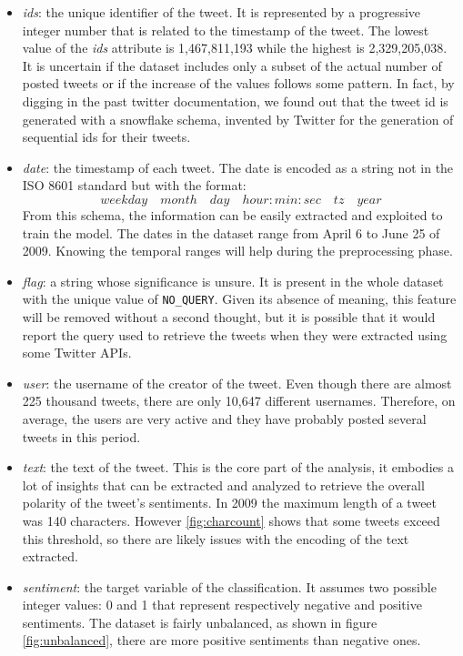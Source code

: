 \documentclass[conference]{IEEEtran}
\begin{document}
\begin{itemize}
    \item \textit{ids}: the unique identifier of the tweet. It is represented by a progressive integer number that is related to the timestamp of the tweet. The lowest value of the \textit{ids} attribute is 1,467,811,193 while the highest is 2,329,205,038. It is uncertain if the dataset includes only a subset of the actual number of posted tweets or if the increase of the values follows some pattern. In fact, by digging in the past twitter documentation, we found out that the tweet id is generated with a snowflake schema, invented by Twitter for the generation of sequential ids for their tweets.
    \item \textit{date}: the timestamp of each tweet. The date is encoded as a string not in the ISO 8601 standard\cite{iso8601} but with the format:
    $$weekday \quad month \quad day \quad hour:min:sec \quad tz \quad year$$
    From this schema, the information can be easily extracted and exploited to train the model. The dates in the dataset range from April 6 to June 25 of 2009. Knowing the temporal ranges will help during the preprocessing phase.
    \item \textit{flag}: a string whose significance is unsure. It is present in the whole dataset with the unique value of \texttt{NO\_QUERY}. Given its absence of meaning, this feature will be removed without a second thought, but it is possible that it would report the query used to retrieve the tweets when they were extracted using some Twitter APIs.
    \item \textit{user}: the username of the creator of the tweet. Even though there are almost 225 thousand tweets, there are only 10,647 different usernames. Therefore, on average, the users are very active and they have probably posted several tweets in this period.
    \item \textit{text}: the text of the tweet. This is the core part of the analysis, it embodies a lot of insights that can be extracted and analyzed to retrieve the overall polarity of the tweet's sentiments. In 2009 the maximum length of a tweet was 140 characters\cite{tweet_lenght}. However \ref{fig:charcount} shows that some tweets exceed this threshold, so there are likely issues with the encoding of the text extracted.
    \item \textit{sentiment}: the target variable of the classification. It assumes two possible integer values: 0 and 1 that represent respectively negative and positive sentiments. The dataset is fairly unbalanced, as shown in figure \ref{fig:unbalanced}, there are more positive sentiments than negative ones.
\end{itemize}
\end{document}
